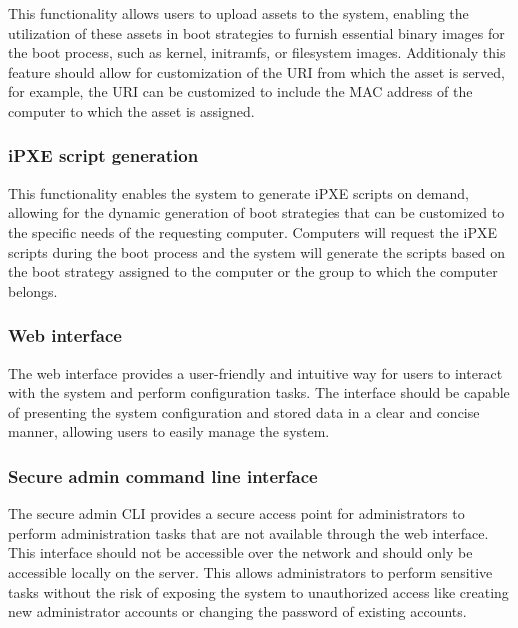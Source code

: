\documentclass[../main.tex]{subfiles}
\begin{document}
This functionality allows users to upload assets to the system, enabling the utilization of these assets in boot strategies to furnish essential binary images for the boot process, such as kernel, initramfs, or filesystem images.
Additionaly this feature should allow for customization of the URI from which the asset is served, for example, the URI can be customized to include the MAC address of the computer to which the asset is assigned.

\subsubsection{iPXE script generation}
\label{req-f:ipxe-script-generation}

This functionality enables the system to generate iPXE scripts on demand, allowing for the dynamic generation of boot strategies that can be customized to the specific needs of the requesting computer.
Computers will request the iPXE scripts during the boot process and the system will generate the scripts based on the boot strategy assigned to the computer or the group to which the computer belongs.

\subsubsection{Web interface}
\label{req-f:web-interface}

The web interface provides a user-friendly and intuitive way for users to interact with the system and perform configuration tasks.
The interface should be capable of presenting the system configuration and stored data in a clear and concise manner, allowing users to easily manage the system.

\subsubsection{Secure admin command line interface}
\label{req-f:secure-admin-cli}

The secure admin CLI provides a secure access point for administrators to perform administration tasks that are not available through the web interface.
This interface should not be accessible over the network and should only be accessible locally on the server.
This allows administrators to perform sensitive tasks without the risk of exposing the system to unauthorized access like creating new administrator accounts or changing the password of existing accounts.
\end{document}
